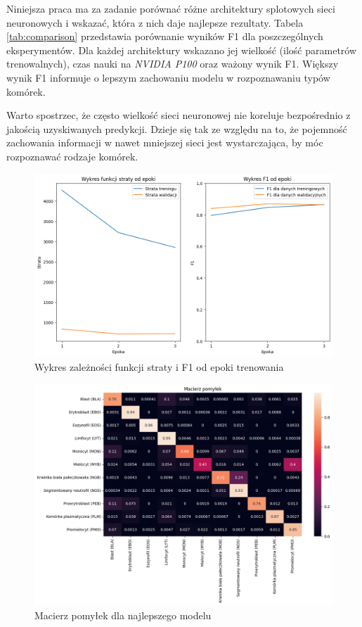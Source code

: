Niniejsza praca ma za zadanie porównać różne architektury splotowych sieci neuronowych i wskazać, która z nich daje najlepsze rezultaty.
Tabela \ref{tab:comparison} przedstawia porównanie wyników F1 dla poszczególnych eksperymentów.
Dla każdej architektury wskazano jej wielkość (ilość parametrów trenowalnych), czas nauki na \textit{NVIDIA P100} oraz ważony wynik F1.
Większy wynik F1 informuje o lepszym zachowaniu modelu w rozpoznawaniu typów komórek.

Warto spostrzec, że często wielkość sieci neuronowej nie koreluje bezpośrednio z jakością uzyskiwanych predykcji.
Dzieje się tak ze względu na to, że pojemność zachowania informacji w nawet mniejszej sieci jest wystarczająca, by móc rozpoznawać rodzaje komórek.

\begin{figure}
    \centering
    \includegraphics[width=\textwidth]{experiments/efficientnet_b0/combined}
    \caption{Wykres zależności funkcji straty i F1 od epoki trenowania}
    \label{fig:plot}
\end{figure}

\begin{figure}
    \centering
    \includegraphics[width=\textwidth]{experiments/efficientnet_b0/confusion_matrix}
    \caption{Macierz pomyłek dla najlepszego modelu}
    \label{fig:confusion_matrix}
\end{figure}

